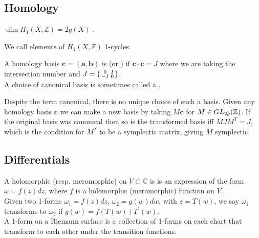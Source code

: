 \documentclass{article}
\begin{document}
\subsection{Homology}
\begin{lemma}
	$\dim H_1(X, \mathbb{Z}) = 2g(X)$ . 
\end{lemma}

\begin{definition}
	We call elements of $H_1(X, \mathbb{Z})$ 1-cycles. 
\end{definition}

\begin{definition}
	A homology basis $\bm{c} = (\bm{a},\bm{b})$ is  (or ) if $\bm{c} \cdot \bm{c} = J$ where we are taking the intersection number and $J=\begin{psmallmatrix} 0 & I \\ -I & 0 \end{psmallmatrix}$. \\
	A choice of canonical basis is sometimes called a . 
\end{definition}
\begin{remark}
	Despite the term canonical, there is no unique choice of such a basis. Given any homology basis $\bm{c}$ we can make a new basis by taking $M\bm{c}$ for $M\in GL_{2g}(\mathbb{Z})$. If the original basis was canonical then so is the transformed basis iff $MJM^T = J$, which is the condition for $M^T$ to be a symplectic matrix, giving $M$ symplectic. 
\end{remark}

\subsection{Differentials}
\begin{definition}
	A holomorphic (resp. meromorphic)  on $V \subset \mathbb{C}$ is is an expression of the form $\omega = f(z)dz$, where $f$ is a holomorphic (meromorphic) function on $V$. \\
	Given two 1-forms $\omega_1 = f(z) dz$, $\omega_2 = g(w) dw$, with $z=T(w)$, we say $\omega_1$ transforms to $\omega_2$ if $g(w) = f(T(w)) T^\prime(w)$. \\
	A 1-form on a Riemann surface is a collection of 1-forms on each chart that transform to each other under the transition functions.  
\end{definition}
\end{document}
